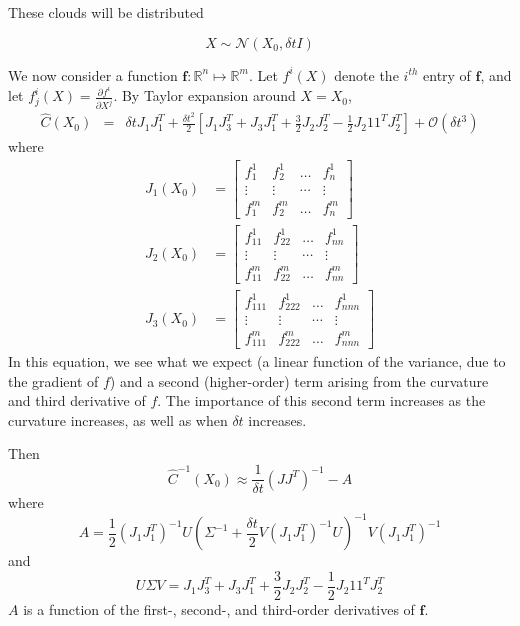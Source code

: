 \documentclass[1p]{elsarticle}
\begin{document}
These clouds will be distributed 

\begin{equation}
X \sim \mathcal{N}\left( X_0, \delta t I \right)
\end{equation}


We now consider a function $\mathbf{f}: \mathbb{R}^n \mapsto \mathbb{R}^m$.
%
Let $f^i(X)$ denote the $i^{th}$ entry of $\mathbf{f}$, and let $f^i_j(X) = \frac{\partial f^i}{\partial X^j}$.
%
By Taylor expansion around $X=X_0$,
%
\begin{eqnarray}
\hat{C}(X_0) &=& \delta t J_1 J_1^T 
+ \frac{\delta t^2}{2} \left[ J_1 J_3^T + J_3 J_1^T  
+ \frac{3}{2} J_2 J_2^T 
-\frac{1 }{2} J_2 1 1^T J_2^T \right]
+ \mathcal{O} (\delta t^3) %
\end{eqnarray}
where
\begin{equation}
\begin{aligned}
J_1(X_0) &= \begin{bmatrix}
f_1^1 & f_2^1 & \dots & f_n^1 \\
\vdots & \vdots & \cdots & \vdots \\
f_1^m & f_2^m & \dots & f_n^m
\end{bmatrix}\\
%
J_2(X_0) &= \begin{bmatrix}
f_{11}^1 & f_{22}^1 & \dots & f_{nn}^1 \\
\vdots & \vdots & \cdots & \vdots \\
f_{11}^m & f_{22}^m & \dots & f_{nn}^m
\end{bmatrix}\\
%
J_3(X_0) &= \begin{bmatrix}
f_{111}^1 & f_{222}^1 & \dots & f_{nnn}^1 \\
\vdots & \vdots & \cdots & \vdots \\
f_{111}^m & f_{222}^m & \dots & f_{nnn}^m
\end{bmatrix}
\end{aligned}
\end{equation}
%
In this equation, we see what we expect (a linear function of the variance, due to the gradient of $f$) and a second (higher-order) term arising from the curvature and third derivative of $f$.
%
The importance of this second term increases as the curvature increases, as well as when $\delta t$ increases. 



Then
\begin{equation}
\hat{C}^{-1}(X_0) \approx \frac{1}{\delta t} \left( J J^T \right)^{-1} - A
\end{equation}
%
where 
\begin{equation}
A = \frac{1}{2} (J_1 J_1^T)^{-1} U \left(\Sigma^{-1} + \frac{\delta t}{2} V \left( J_1 J_1^T \right)^{-1} U \right)^{-1} V \left( J_1 J_1^T \right)^{-1}
\end{equation}
and
\begin{equation}
U \Sigma V = J_1 J_3^T + J_3 J_1^T + \frac{3}{2} J_2 J_2^T -\frac{1 }{2} J_2 1 1^T J_2^T 
\end{equation}
$A$ is a function of the first-, second-, and third-order derivatives of $\mathbf{f}$.
\end{document}
